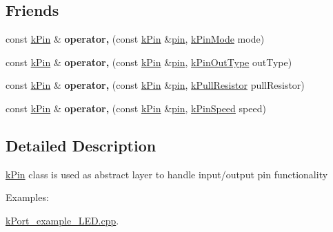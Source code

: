 \subsection*{Friends}
\begin{DoxyCompactItemize}
\item 
const \hyperlink{classkPin}{k\+Pin} \& {\bfseries operator,} (const \hyperlink{classkPin}{k\+Pin} \&\hyperlink{classkPin_a0da283781fc832c77419bc71ff356cc1}{pin}, \hyperlink{classkPin_a311ea70432d9c48754eacc8d8ce8a949}{k\+Pin\+Mode} mode)\hypertarget{classkPin_ab0ba0ce3d6f1a0f08480748e102cd0ba}{}\label{classkPin_ab0ba0ce3d6f1a0f08480748e102cd0ba}

\item 
const \hyperlink{classkPin}{k\+Pin} \& {\bfseries operator,} (const \hyperlink{classkPin}{k\+Pin} \&\hyperlink{classkPin_a0da283781fc832c77419bc71ff356cc1}{pin}, \hyperlink{classkPin_a5aa9350fb0a7617a568344d8a074837f}{k\+Pin\+Out\+Type} out\+Type)\hypertarget{classkPin_a19d953ec4a8e71818ba72d18d769cda2}{}\label{classkPin_a19d953ec4a8e71818ba72d18d769cda2}

\item 
const \hyperlink{classkPin}{k\+Pin} \& {\bfseries operator,} (const \hyperlink{classkPin}{k\+Pin} \&\hyperlink{classkPin_a0da283781fc832c77419bc71ff356cc1}{pin}, \hyperlink{classkPin_a4d00e25b986e7851957a68deb1c91b18}{k\+Pull\+Resistor} pull\+Resistor)\hypertarget{classkPin_a53b5fbd0822536e24e4d01af9871b216}{}\label{classkPin_a53b5fbd0822536e24e4d01af9871b216}

\item 
const \hyperlink{classkPin}{k\+Pin} \& {\bfseries operator,} (const \hyperlink{classkPin}{k\+Pin} \&\hyperlink{classkPin_a0da283781fc832c77419bc71ff356cc1}{pin}, \hyperlink{classkPin_a93c5cec6b9b90fda782cfa847eacdb8b}{k\+Pin\+Speed} speed)\hypertarget{classkPin_a68646ef55ab985565d1119ebf4a4cf2f}{}\label{classkPin_a68646ef55ab985565d1119ebf4a4cf2f}

\end{DoxyCompactItemize}


\subsection{Detailed Description}
\hyperlink{classkPin}{k\+Pin} class is used as abstract layer to handle input/output pin functionality \begin{Desc}
\item[Examples\+: ]\par
\hyperlink{kPort_example_LED_8cpp-example}{k\+Port\+\_\+example\+\_\+\+L\+E\+D.\+cpp}.\end{Desc}


